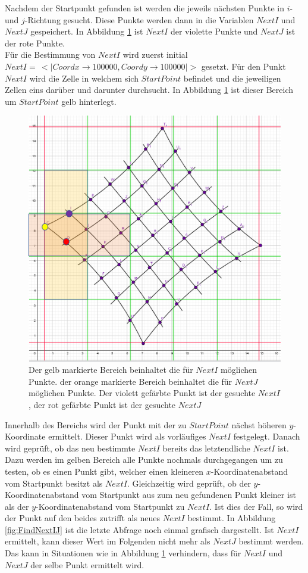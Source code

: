 Nachdem der Startpunkt gefunden ist werden die jeweils nächsten Punkte in $i$- und $j$-Richtung gesucht. Diese Punkte werden dann in die Variablen $NextI$ und $NextJ$ gespeichert. In Abbildung \ref{fig:NextINextJ} ist $NextI$ der violette Punkte und $NextJ$ ist der rote Punkte. \\

Für die Bestimmung von $NextI$ wird zuerst initial $NextI = \, <|Coordx \rightarrow 100 000, Coordy \rightarrow 100 000|>$ gesetzt. Für den Punkt $NextI$ wird die Zelle in welchem sich $StartPoint$ befindet und die jeweiligen Zellen eins darüber und darunter durchsucht. In Abbildung \ref{fig:NextINextJ} ist dieser Bereich um $StartPoint$ gelb hinterlegt. 



\begin{figure}[!htb]
	\centering
	\includegraphics[width=0.6\linewidth]{images/VerzeichnetesSchachbrett_2.png}
	\caption[Finden der Startvektoren in Schachbrettpunkten]{Der gelb markierte Bereich beinhaltet die für $NextI$ möglichen Punkte. der orange markierte Bereich beinhaltet die für $NextJ$ möglichen Punkte. Der violett gefärbte Punkt ist der gesuchte $NextI$, der rot gefärbte Punkt ist der gesuchte $NextJ$}
	\label{fig:NextINextJ}
\end{figure}


Innerhalb des Bereichs wird der Punkt mit der zu $StartPoint$ nächst höheren $y$-Koordinate ermittelt. Dieser Punkt wird als vorläufiges $NextI$ festgelegt. Danach wird geprüft, ob das neu bestimmte $NextI$ bereits das letztendliche $NextI$ ist. Dazu werden im gelben Bereich alle Punkte nochmals durchgegangen um zu testen, ob es einen Punkt gibt, welcher einen kleineren $x$-Koordinatenabstand vom Startpunkt besitzt als $NextI$. Gleichzeitig wird geprüft, ob der $y$-Koordinatenabstand vom Startpunkt aus zum neu gefundenen Punkt kleiner ist als der $y$-Koordinatenabstand vom Startpunkt zu $NextI$.  Ist dies der Fall, so wird der Punkt auf den beides zutrifft als neues $NextI$ bestimmt. In Abbildung \ref{fig:FindNextIJ} ist die letzte Abfrage noch einmal grafisch dargestellt. Ist $NextI$ ermittelt, kann dieser Wert im Folgenden nicht mehr als $NextJ$ bestimmt werden. Das kann in Situationen wie in Abbildung \ref{fig:NextINextJ} verhindern, dass für $NextI$ und $NextJ$ der selbe Punkt ermittelt wird.\\

